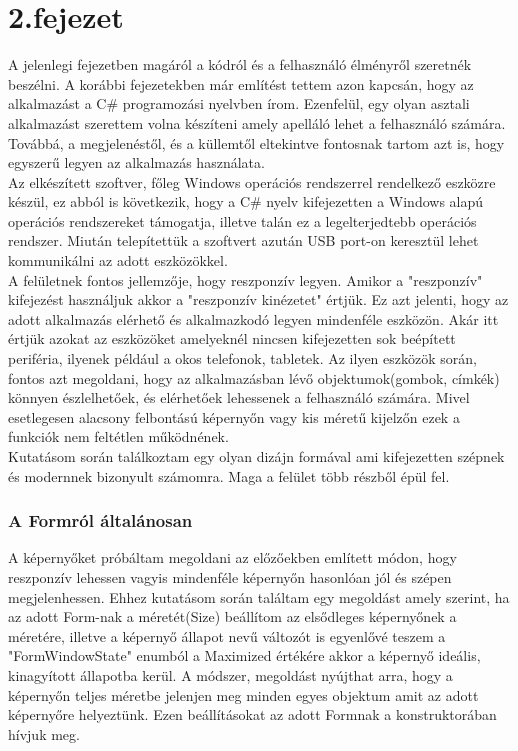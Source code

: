 \documentclass[tocnopagenum]{thesis-ekf}
\theoremstyle{definition}
\theoremstyle{remark}
\begin{document}
	\chapter*{2.fejezet}
	A jelenlegi fejezetben magáról a kódról és a felhasználó élményről szeretnék beszélni.
	A korábbi fejezetekben már említést tettem azon kapcsán, hogy az alkalmazást a C\# programozási nyelvben írom. Ezenfelül, egy olyan asztali alkalmazást szerettem volna készíteni amely apelláló lehet a felhasználó számára. Továbbá, a megjelenéstől, és a küllemtől eltekintve fontosnak tartom azt is, hogy egyszerű legyen az alkalmazás használata.
	\\
	Az elkészített szoftver, főleg Windows operációs rendszerrel rendelkező eszközre készül, ez abból is következik, hogy a C\# nyelv kifejezetten a Windows alapú operációs rendszereket támogatja, illetve talán ez a legelterjedtebb operációs rendszer.
	Miután telepítettük a szoftvert azután USB port-on keresztül lehet kommunikálni az adott eszközökkel.
	\\
	A felületnek fontos jellemzője, hogy reszponzív legyen. Amikor a "reszponzív" kifejezést használjuk akkor a "reszponzív kinézetet" értjük. Ez azt jelenti, hogy az adott alkalmazás elérhető és alkalmazkodó legyen mindenféle eszközön. Akár itt értjük azokat az eszközöket amelyeknél nincsen kifejezetten sok beépített periféria, ilyenek például a okos telefonok, tabletek. Az ilyen eszközök során, fontos azt megoldani, hogy az alkalmazásban lévő objektumok(gombok, címkék) könnyen észlelhetőek, és elérhetőek lehessenek a felhasználó számára. 
	Mivel esetlegesen alacsony felbontású képernyőn vagy kis méretű kijelzőn ezek a funkciók nem feltétlen működnének. 
	\\
	Kutatásom során találkoztam egy olyan dizájn formával ami kifejezetten szépnek és modernnek bizonyult számomra.\cite{modernUI} 
	Maga a felület több részből épül fel.
	\\
	\subsection*{A Formról általánosan}
	A képernyőket próbáltam megoldani az előzőekben említett módon, hogy reszponzív lehessen vagyis mindenféle képernyőn hasonlóan jól és szépen megjelenhessen. Ehhez kutatásom során találtam egy megoldást amely szerint, ha az adott Form-nak a méretét(Size) beállítom az elsődleges képernyőnek a méretére, illetve a képernyő állapot nevű változót is egyenlővé teszem a "FormWindowState" enumból a Maximized értékére akkor a képernyő ideális, kinagyított állapotba kerül. A módszer, megoldást nyújthat arra, hogy a képernyőn teljes méretbe jelenjen meg minden egyes objektum amit az adott képernyőre helyeztünk. Ezen beállításokat az adott Formnak a konstruktorában hívjuk meg.
\end{document}
